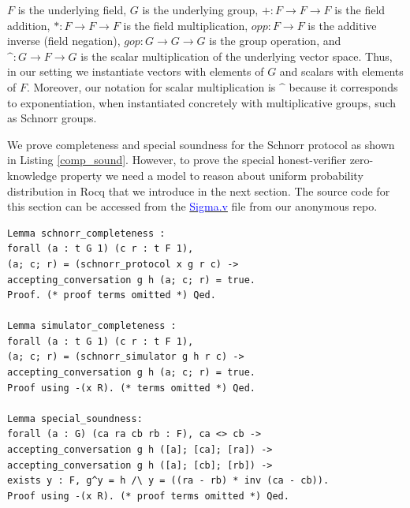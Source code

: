 \documentclass[sigconf,anonymous,review]{acmart}
\begin{document}
\noindent
 $F$ is the underlying field, $G$ is the underlying group,
 $+ : F \rightarrow F \rightarrow F$ is the field addition,
 $* : F \rightarrow F \rightarrow F$ is the field multiplication, 
 $opp : F \rightarrow F$ is the additive inverse (field negation),
 $gop : G \rightarrow G \rightarrow G$ is the group operation, and
 $\mbox{\textasciicircum}: G \rightarrow F \rightarrow G$ is the scalar multiplication of the underlying vector space.  
Thus, in our setting we instantiate vectors with elements of $G$ and scalars with elements of $F$. 
Moreover, our notation for scalar multiplication is $\mbox{\textasciicircum}$ because it corresponds to exponentiation, 
when instantiated concretely with multiplicative groups, such as Schnorr groups.

We prove completeness and special soundness for the Schnorr protocol 
as shown in Listing \ref{comp_sound}. However, to prove the special honest-verifier 
zero-knowledge property we need a model to reason about uniform probability 
distribution in Rocq that we introduce in the next section. The source code for this section can be accessed from the
\href{https://anonymous.4open.science/r/SigmaProtocol-EBA5/src/Crypto/Sigma.v}{\textcolor{blue}{Sigma.v}} file from our anonymous repo.
 


\begin{lstlisting}[frame=single, language=Coq, caption={Completeness and Soundness},
  label={comp_sound},captionpos=t, basicstyle=\ttfamily\footnotesize,
  abovecaptionskip=-\medskipamount]
Lemma schnorr_completeness : 
forall (a : t G 1) (c r : t F 1),
(a; c; r) = (schnorr_protocol x g r c) ->
accepting_conversation g h (a; c; r) = true.
Proof. (* proof terms omitted *) Qed.
  
Lemma simulator_completeness : 
forall (a : t G 1) (c r : t F 1),
(a; c; r) = (schnorr_simulator g h r c) ->
accepting_conversation g h (a; c; r) = true.
Proof using -(x R). (* terms omitted *) Qed. 
  
Lemma special_soundness: 
forall (a : G) (ca ra cb rb : F), ca <> cb ->
accepting_conversation g h ([a]; [ca]; [ra]) ->  
accepting_conversation g h ([a]; [cb]; [rb]) ->
exists y : F, g^y = h /\ y = ((ra - rb) * inv (ca - cb)).
Proof using -(x R). (* proof terms omitted *) Qed.
  
\end{lstlisting}
 
\end{document}
